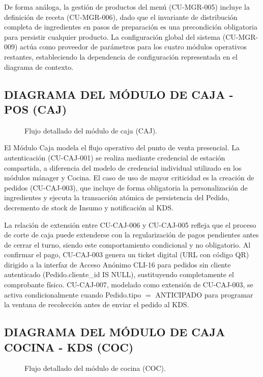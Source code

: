 De forma análoga, la gestión de productos del menú (CU-MGR-005) incluye la definición de receta (CU-MGR-006), dado que el invariante de distribución completa de ingredientes en pasos de preparación es una precondición obligatoria para persistir cualquier producto. La configuración global del sistema (CU-MGR-009) actúa como proveedor de parámetros para los cuatro módulos operativos restantes, estableciendo la dependencia de configuración representada en el diagrama de contexto. 

\subsection{DIAGRAMA DEL MÓDULO DE CAJA - POS (CAJ)}
\begin{figure}[H]
    \centering
    
    \caption{Flujo detallado del módulo de caja (CAJ).}
    \label{fig:casos_uso_caja}
\end{figure}

El Módulo Caja modela el flujo operativo del punto de venta presencial. La autenticación (CU-CAJ-001) se realiza mediante credencial de estación compartida, a diferencia del modelo de credencial individual utilizado en los módulos mánager y Cocina. El caso de uso de mayor criticidad es la creación de pedidos (CU-CAJ-003), que incluye de forma obligatoria la personalización de ingredientes y ejecuta la transacción atómica de persistencia del Pedido, decremento de stock de Insumo y notificación al KDS.  

La relación de extensión entre CU-CAJ-006 y CU-CAJ-005 refleja que el proceso de corte de caja puede extenderse con la regularización de pagos pendientes antes de cerrar el turno, siendo este comportamiento condicional y no obligatorio. Al confirmar el pago, CU-CAJ-003 genera un ticket digital (URL con código QR) dirigido a la interfaz de Acceso Anónimo CLI-16 para pedidos sin cliente autenticado (Pedido.cliente\_id IS NULL), sustituyendo completamente el comprobante físico. CU-CAJ-007, modelado como extensión de CU-CAJ-003, se activa condicionalmente cuando Pedido.tipo $=$ ANTICIPADO para programar la ventana de recolección antes de enviar el pedido al KDS. 

\subsection{DIAGRAMA DEL MÓDULO DE CAJA COCINA - KDS (COC)}
\begin{figure}[H]
    \centering
    
    \caption{Flujo detallado del módulo de cocina (COC).}
    \label{fig:casos_uso_cocina}
\end{figure}

